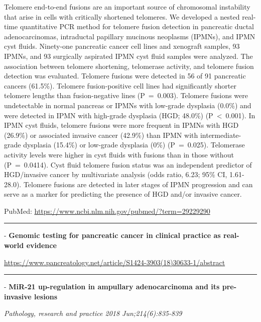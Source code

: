 \documentclass[]{article}
\begin{document}
Telomere end-to-end fusions are an important source of chromosomal
instability that arise in cells with critically shortened telomeres. We
developed a nested real-time quantitative PCR method for telomere fusion
detection in pancreatic ductal adenocarcinomas, intraductal papillary
mucinous neoplasms (IPMNs), and IPMN cyst fluids. Ninety-one pancreatic
cancer cell lines and xenograft samples, 93 IPMNs, and 93 surgically
aspirated IPMN cyst fluid samples were analyzed. The association between
telomere shortening, telomerase activity, and telomere fusion detection
was evaluated. Telomere fusions were detected in 56 of 91 pancreatic
cancers (61.5\%). Telomere fusion-positive cell lines had significantly
shorter telomere lengths than fusion-negative lines (P~=~0.003).
Telomere fusions were undetectable in normal pancreas or IPMNs with
low-grade dysplasia (0.0\%) and were detected in IPMN with high-grade
dysplasia (HGD; 48.0\%) (P~\textless{}~0.001). In IPMN cyst fluids,
telomere fusions were more frequent in IPMNs with HGD (26.9\%) or
associated invasive cancer (42.9\%) than IPMN with intermediate-grade
dysplasia (15.4\%) or low-grade dysplasia (0\%) (P~=~0.025). Telomerase
activity levels were higher in cyst fluids with fusions than in those
without (P~=~0.0414). Cyst fluid telomere fusion status was an
independent predictor of HGD/invasive cancer by multivariate analysis
(odds ratio, 6.23; 95\% CI, 1.61-28.0). Telomere fusions are detected in
later stages of IPMN progression and can serve as a marker for
predicting the presence of HGD and/or invasive cancer.

PubMed: \url{https://www.ncbi.nlm.nih.gov/pubmed/?term=29229290}

{}

{}

\begin{center}\rule{0.5\linewidth}{\linethickness}\end{center}

 - \textbf{Genomic testing for pancreatic cancer in clinical practice as
real-world evidence}

\url{https://www.pancreatology.net/article/S1424-3903(18)30633-1/abstract}

\begin{center}\rule{0.5\linewidth}{\linethickness}\end{center}

 - \textbf{MiR-21 up-regulation in ampullary adenocarcinoma and its
pre-invasive lesions}

\emph{Pathology, research and practice 2018 Jun;214(6):835-839}
\end{document}
